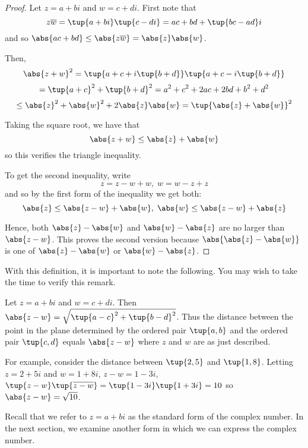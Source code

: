 \begin{proof}
Let $z=a+bi$ and $w=c+di$. First note that
\begin{equation*}
z
\overline{w}=\tup{a+bi} \tup{c-di} =ac+bd+\tup{
bc-ad}i
\end{equation*}
and so $\abs{ac+bd}\leq \abs{z\overline{w}}=\abs{z}\abs{w}$.

Then,
\begin{equation*}
\abs{z+w}^{2}=\tup{a+c+i\tup{b+d} } \tup{
a+c-i\tup{b+d} }
\end{equation*}
\begin{equation*}
=\tup{a+c} ^{2}+\tup{b+d}
^{2}=a^{2}+c^{2}+2ac+2bd+b^{2}+d^{2}
\end{equation*}
\begin{equation*}
\leq \abs{z}^{2}+\abs{w}^{2}+2\abs{z}\abs{w}=\tup{\abs{z}+\abs{w}} ^{2}
\end{equation*}

Taking the square root, we have that 
\begin{equation*}
\abs{z+w}\leq \abs{z}+\abs{w}
\end{equation*}
so this verifies the triangle inequality. 

To get the  second inequality, write
\begin{equation*}
z=z-w+w,\;w=w-z+z
\end{equation*}
and so by the first form of the inequality we get both:
\begin{equation*}
\abs{z}\leq \abs{z-w}+\abs{w},\;\abs{w}\leq \abs{z-w}+\abs{z}\end{equation*}

Hence,  both $\abs{z}-\abs{w}$ and 
$\abs{w}-\abs{z}$ are no larger than 
$\abs{z-w}$. This proves the second version because 
$\abs{\abs{z}-\abs{w}}$ is
one of $\abs{z}-\abs{w}$ or $\abs{w}-\abs{z}$. 
\end{proof}

With this definition, it is important to note the following. You may wish to take
the time to verify this remark.

Let $z=a+bi$ and $w=c+di$. Then $\abs{z-w} =\sqrt{\tup{
a-c} ^{2}+\tup{b-d} ^{2}}$. Thus the distance between the
point in the plane determined by the ordered pair $\tup{a,b} $ and
the ordered pair $\tup{c,d} $ equals $\abs{z-w} $ where $z$
and $w$ are as just described.

For example, consider the distance between $\tup{2,5} $ and $\tup{
1,8}$. Letting $z=2+5i$ and $w=1+8i$, $z-w=1-3i$, $\tup{z-w}
\tup{\overline{z-w}} =\tup{1-3i} \tup{1+3i}
= 10$ so $\abs{z-w}=\sqrt{10}$.

Recall that we refer to $z=a+bi$ as the standard form of the complex number. In the next section, 
we examine another form in which we can express the complex number. 

